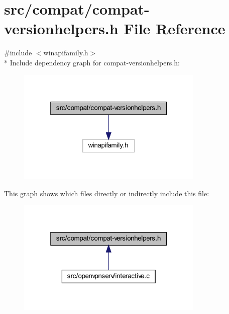 \hypertarget{compat-versionhelpers_8h}{}\section{src/compat/compat-\/versionhelpers.h File Reference}
\label{compat-versionhelpers_8h}
{\ttfamily \#include $<$winapifamily.\+h$>$}\\*
Include dependency graph for compat-\/versionhelpers.h\+:
\nopagebreak
\begin{figure}[H]
\begin{center}
\leavevmode
\includegraphics[width=253pt]{compat-versionhelpers_8h__incl}
\end{center}
\end{figure}
This graph shows which files directly or indirectly include this file\+:
\nopagebreak
\begin{figure}[H]
\begin{center}
\leavevmode
\includegraphics[width=253pt]{compat-versionhelpers_8h__dep__incl}
\end{center}
\end{figure}
